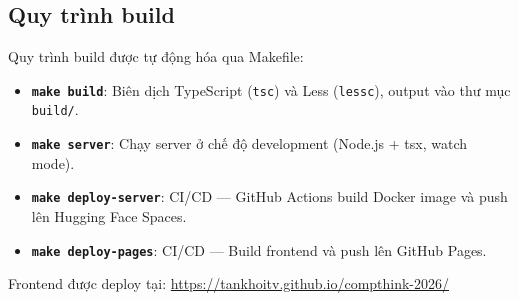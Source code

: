 \subsection{Quy trình build}

Quy trình build được tự động hóa qua Makefile:

\begin{itemize}[topsep=0pt, itemsep=2.5pt, leftmargin=1.5cm]
    \item \textbf{\texttt{make build}}: Biên dịch TypeScript (\texttt{tsc}) và Less (\texttt{lessc}), output vào thư mục \texttt{build/}.
    \item \textbf{\texttt{make server}}: Chạy server ở chế độ development (Node.js + tsx, watch mode).
    \item \textbf{\texttt{make deploy-server}}: CI/CD — GitHub Actions build Docker image và push lên Hugging Face Spaces.
    \item \textbf{\texttt{make deploy-pages}}: CI/CD — Build frontend và push lên GitHub Pages.
\end{itemize}

Frontend được deploy tại: \url{https://tankhoitv.github.io/compthink-2026/}
